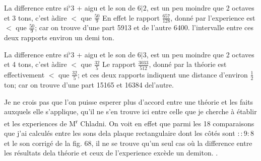 \documentclass[11pt,a4paper]{article}
\begin{document}
La difference entre si$^{\flat}$3 + aigu et le son de $6|2$, est
un peu moindre que 2 octaves et 3 tons, c'est àdire $<$ que $\frac{50}{9}$
En effet le rapport $\frac{657}{128}$, donné par l'experience est
$<$ que $\frac{50}{9}$; car on trouve d'une part 5913 et de l'autre
6400. l'intervalle entre ces deux rapports  environ un
demi ton.

La difference entre si$^{\flat}$3 + aigu et le son de $6|3$, est
un peu moindre que 2 octaves et 4 tons, c'est àdire $<$ que $\frac{32}{5}$
Le rapport $\frac{3033}{512}$, donné par la théorie est effectivement
$<$ que $\frac{32}{5}$; et ces deux rapports indiquent une distance
d'environ $\frac{1}{2}$ ton; car on trouve d'une part 15165 et 16384
del'autre.


Je ne crois pas que l'on puisse esperer plus d'accord entre
une théorie et les faits auxquels elle s'applique, qu'il ne s'en
trouve ici entre  celle que je cherche à établir
et les experiences de M\textsuperscript{r} Chladni. On voit en effet que
parmi les 18 comparaisons que j'ai calculés entre les sons
dela plaque rectangulaire dont les côtés sont $::9:8$ et
le son corrigé de la fig. 68, il ne se trouve qu'un
seul cas où la difference entre les résultats dela théorie
et ceux de l'experience excède un demiton. .
\end{document}
